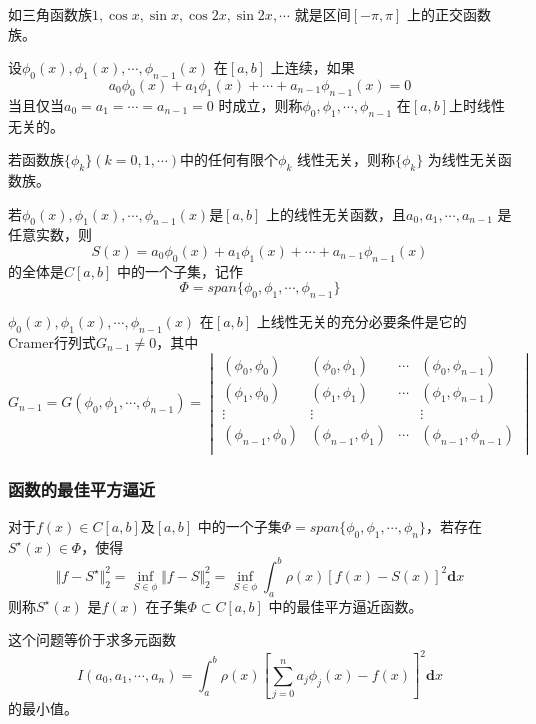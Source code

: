 \documentclass[a4paper]{article}
\begin{document}
如三角函数族$1, \cos x, \sin x, \cos 2x, \sin 2x, \cdots$ 就是区间$[-\pi, \pi]$ 上的正交函数族。

\begin{definition}
	设$\phi_0(x), \phi_1(x), \cdots, \phi_{n-1}(x)$ 在$[a,b]$ 上连续，如果
	\[
		a_0 \phi_0(x) + a_1 \phi_1(x) + \cdots + a_{n-1} \phi_{n-1}(x) = 0
	\] 
	当且仅当$a_0 = a_1 = \cdots = a_{n-1} = 0$ 时成立，则称$\phi_0,\phi_1,\cdots,\phi_{n-1}$ 在$[a,b]$上时线性无关的。
\end{definition}

若函数族$\{\phi_k\} (k=0,1,\cdots)$中的任何有限个$\phi_k$ 线性无关，则称$\{\phi_k\} $ 为线性无关函数族。

若$\phi_0(x), \phi_1(x), \cdots, \phi_{n-1}(x)$是$[a,b]$ 上的线性无关函数，且$a_0,a_1,\cdots,a_{n-1}$ 是任意实数，则
\[
	S(x) = a_0 \phi_0(x) + a_1 \phi_1(x) + \cdots + a_{n-1} \phi_{n-1}(x)
\] 
的全体是$C[a,b]$ 中的一个子集，记作
\[
	\Phi = span \{\phi_0, \phi_1, \cdots, \phi_{n-1}\} 
\] 

\begin{definition}
	$\phi_0(x), \phi_1(x),\cdots, \phi_{n-1}(x)$ 在$[a,b]$ 上线性无关的充分必要条件是它的Cramer行列式$G_{n-1} \neq 0$，其中 
\[
	G_{n-1} = G(\phi_0, \phi_1, \cdots, \phi_{n-1}) = 
\begin{vmatrix} 
	(\phi_0, \phi_0) & (\phi_0, \phi_1) & \cdots & (\phi_0, \phi_{n-1}) \\
	(\phi_1, \phi_0) & (\phi_1, \phi_1) & \cdots & (\phi_1, \phi_{n-1}) \\
	\vdots & \vdots & & \vdots \\
	(\phi_{n-1}, \phi_0) & (\phi_{n-1}, \phi_1) & \cdots & (\phi_{n-1}, \phi_{n-1}) \\
\end{vmatrix} 	
\] 
\end{definition}

\subsubsection{函数的最佳平方逼近}
对于$f(x) \in C[a,b]$及$[a,b]$ 中的一个子集$\Phi = span \{\phi_0, \phi_1, \cdots, \phi_n\} $，若存在$S^{\star}(x) \in \Phi$，使得
\[
	\Vert f - S^{\star} \Vert_2^2 = \inf_{S \in \phi} \Vert f - S \Vert_2^2 = \inf_{S \in \phi} \int_{a}^{b} \rho(x)[f(x) - S(x)]^2 \mathbf{d} x 
\] 
则称$S^{\star}(x)$ 是$f(x)$ 在子集$\Phi \subset C[a,b]$ 中的最佳平方逼近函数。

这个问题等价于求多元函数
\[
	I(a_0, a_1, \cdots, a_n) = \int_{a}^{b} \rho(x) [\sum_{j=0}^{n} a_j \phi_j(x) - f(x)]^2 \mathbf{d} x 
\] 
的最小值。
\end{document}
